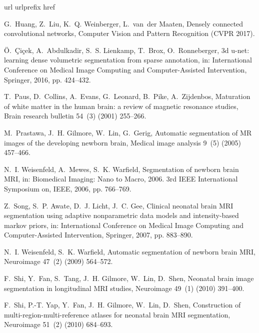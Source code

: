 \documentclass[twoside,espcrc2]{elsarticle}
\begin{document}
\begin{thebibliography}{10}
\expandafter\ifx\csname url\endcsname\relax
  \def\url#1{\texttt{#1}}\fi
\expandafter\ifx\csname urlprefix\endcsname\relax\def\urlprefix{URL }\fi
\expandafter\ifx\csname href\endcsname\relax
  \def\href#1#2{#2} \def\path#1{#1}\fi

G.~Huang, Z.~Liu, K.~Q. Weinberger, L.~van~der Maaten, Densely connected
  convolutional networks, Computer Vision and Pattern Recognition (CVPR 2017).

{\"O}.~{\c{C}}i{\c{c}}ek, A.~Abdulkadir, S.~S. Lienkamp, T.~Brox,
  O.~Ronneberger, 3d u-net: learning dense volumetric segmentation from sparse
  annotation, in: International Conference on Medical Image Computing and
  Computer-Assisted Intervention, Springer, 2016, pp. 424--432.

T.~Paus, D.~Collins, A.~Evans, G.~Leonard, B.~Pike, A.~Zijdenbos, Maturation of
  white matter in the human brain: a review of magnetic resonance studies,
  Brain research bulletin 54~(3) (2001) 255--266.

M.~Prastawa, J.~H. Gilmore, W.~Lin, G.~Gerig, Automatic segmentation of {MR}
  images of the developing newborn brain, Medical image analysis 9~(5) (2005)
  457--466.

N.~I. Weisenfeld, A.~Mewes, S.~K. Warfield, Segmentation of newborn brain
  {MRI}, in: Biomedical Imaging: Nano to Macro, 2006. 3rd IEEE International
  Symposium on, IEEE, 2006, pp. 766--769.

Z.~Song, S.~P. Awate, D.~J. Licht, J.~C. Gee, Clinical neonatal brain {MRI}
  segmentation using adaptive nonparametric data models and intensity-based
  markov priors, in: International Conference on Medical Image Computing and
  Computer-Assisted Intervention, Springer, 2007, pp. 883--890.

N.~I. Weisenfeld, S.~K. Warfield, Automatic segmentation of newborn brain
  {MRI}, Neuroimage 47~(2) (2009) 564--572.

F.~Shi, Y.~Fan, S.~Tang, J.~H. Gilmore, W.~Lin, D.~Shen, Neonatal brain image
  segmentation in longitudinal {MRI} studies, Neuroimage 49~(1) (2010)
  391--400.

F.~Shi, P.-T. Yap, Y.~Fan, J.~H. Gilmore, W.~Lin, D.~Shen, Construction of
  multi-region-multi-reference atlases for neonatal brain {MRI} segmentation,
  Neuroimage 51~(2) (2010) 684--693.


\end{thebibliography}
\end{document}
